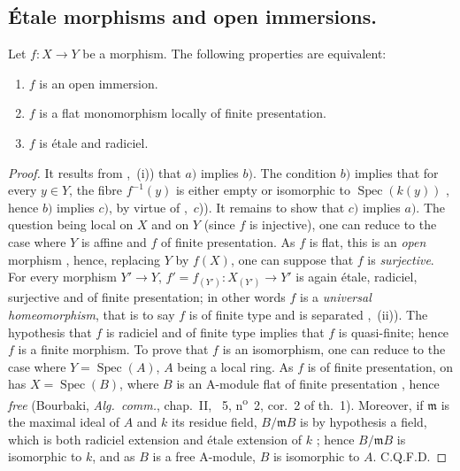 \subsection{\'Etale morphisms and open immersions.}
\label{subsection:IV.17.9}

\begin{theorem}[17.9.1]
\label{IV.17.9.1}
Let $f:X\to Y$ be a morphism.
The following properties are equivalent:
\begin{enumerate}
  \item[a)] $f$ is an open immersion.
  \item[b)] $f$ is a flat monomorphism locally of finite presentation.
  \item[c)] $f$ is \'etale and radiciel.
\end{enumerate}
\end{theorem}

\begin{proof}
It results from ,~(i)) that $a)$ implies $b)$.
The condition $b)$ implies that for every $y\in Y$, the fibre $f^{-1}(y)$ is either empty or isomorphic to $\operatorname{Spec}(k(y))$ , hence $b)$ implies $c)$, by virtue of ,~$c$)).
It remains to show that $c)$ implies $a)$.
The question being local on $X$ and on $Y$ (since $f$ is injective), one can reduce to the case where $Y$ is affine and $f$ of finite presentation.
As $f$ is flat, this is an \emph{open} morphism , hence, replacing $Y$ by $f(X)$, one can suppose that $f$ is \emph{surjective}.
For every morphism $Y'\to Y$, $f'=f_{(Y')}:X_{(Y')}\to Y'$ is again \'etale, radiciel, surjective and of finite presentation; in other words $f$ is a \emph{universal homeomorphism}, that is to say $f$ is of finite type and is separated ,~(ii)).
The hypothesis that $f$ is radiciel and of finite type implies that $f$ is quasi-finite; hence  $f$ is a finite morphism.
To prove that $f$ is an isomorphism, one can reduce to the case where $Y=\operatorname{Spec}(A)$, $A$ being a local ring.
As $f$ is of finite presentation, on has $X=\operatorname{Spec}(B)$, where $B$ is an A-module flat of finite presentation , hence \emph{free} (Bourbaki, \emph{Alg.~comm.}, chap.~II, \textsection~5, n\textsuperscript{o}~2, cor.~2 of th.~1).
Moreover, if $\mathfrak{m}$ is the maximal ideal of $A$ and $k$ its residue field, $B/\mathfrak{m}B$ is by hypothesis a field, which is both radiciel extension and \'etale extension of $k$ ; hence $B/\mathfrak{m}B$ is isomorphic to $k$, and as $B$ is a free A-module, $B$ is isomorphic to $A$.
C.Q.F.D.
\end{proof}

